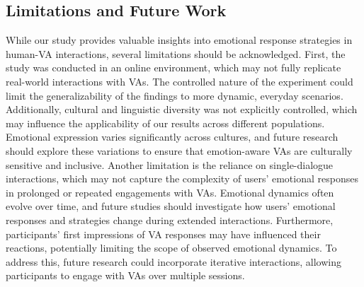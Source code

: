 \subsection{Limitations and Future Work}

While our study provides valuable insights into emotional response strategies in human-VA interactions, several limitations should be acknowledged. First, the study was conducted in an online environment, which may not fully replicate real-world interactions with VAs. The controlled nature of the experiment could limit the generalizability of the findings to more dynamic, everyday scenarios. Additionally, cultural and linguistic diversity was not explicitly controlled, which may influence the applicability of our results across different populations. Emotional expression varies significantly across cultures, and future research should explore these variations to ensure that emotion-aware VAs are culturally sensitive and inclusive.
Another limitation is the reliance on single-dialogue interactions, which may not capture the complexity of users' emotional responses in prolonged or repeated engagements with VAs. Emotional dynamics often evolve over time, and future studies should investigate how users' emotional responses and strategies change during extended interactions. Furthermore, participants' first impressions of VA responses may have influenced their reactions, potentially limiting the scope of observed emotional dynamics. To address this, future research could incorporate iterative interactions, allowing participants to engage with VAs over multiple sessions.


